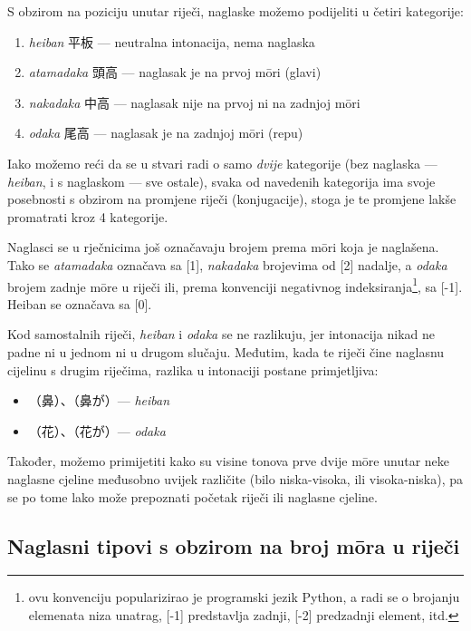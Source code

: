 S obzirom na poziciju unutar riječi, naglaske možemo podijeliti u četiri kategorije:
\begin{enumerate}
	\item \textit{heiban} 平板 --- neutralna intonacija, nema naglaska
	\item \textit{atamadaka} 頭高 --- naglasak je na prvoj m\=ori (glavi)
	\item \textit{nakadaka} 中高 --- naglasak nije na prvoj ni na zadnjoj m\=ori
	\item \textit{odaka} 尾高 --- naglasak je na zadnjoj m\=ori (repu)
\end{enumerate}
Iako možemo reći da se u stvari radi o samo \textit{dvije} kategorije (bez naglaska --- \textit{heiban}, i s naglaskom --- sve ostale), svaka od navedenih kategorija ima svoje posebnosti s obzirom na promjene riječi (konjugacije), stoga je te promjene lakše promatrati kroz 4 kategorije.

Naglasci se u rječnicima još označavaju brojem prema m\=ori koja je naglašena.
Tako se \textit{atamadaka} označava sa [1], \textit{nakadaka} brojevima od [2] nadalje, a \textit{odaka} brojem zadnje m\=ore u riječi ili, prema konvenciji negativnog indeksiranja\footnote{ovu konvenciju popularizirao je programski jezik Python, a radi se o brojanju elemenata niza unatrag, [-1] predstavlja zadnji, [-2] predzadnji element, itd.}, sa [-1].
Heiban se označava sa [0].

Kod samostalnih riječi, \textit{heiban} i \textit{odaka} se ne razlikuju, jer intonacija nikad ne padne ni u jednom ni u drugom slučaju.
Međutim, kada te riječi čine naglasnu cijelinu s drugim riječima, razlika u intonaciji postane primjetljiva:
\begin{itemize}
	\item {}（鼻）、（鼻が）--- \textit{heiban}
	\item {}（花）、（花が）--- \textit{odaka}
\end{itemize}

Također, možemo primijetiti kako su visine tonova prve dvije m\=ore unutar neke naglasne cjeline međusobno uvijek različite (bilo niska-visoka, ili visoka-niska), pa se po tome lako može prepoznati početak riječi ili naglasne cjeline.

\subsection{Naglasni tipovi s obzirom na broj m\=ora u riječi}
